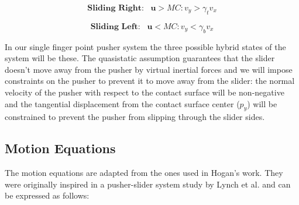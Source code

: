 \documentclass[12,twoside]{TFG-GM}
\theoremstyle{definition}
\theoremstyle{remark}
\begin{document}
\begin{equation}\label{eq:right_cone}
\textbf{Sliding Right:}\,\,\,\,\, \textbf{u} > MC: v_y > \gamma_t v_x            
\end{equation}

\begin{equation}\label{eq:left_cone}
\textbf{Sliding Left:}\,\,\,\,\, \textbf{u} < MC: v_y < \gamma_b v_x
\end{equation}

In our single finger point pusher system the three possible hybrid states of the system will be these. The quasistatic assumption guarantees that the slider doesn't move away from the pusher by virtual inertial forces and we will impose constraints on the pusher to prevent it to move away from the slider: the normal velocity of the pusher with respect to the contact surface will be non-negative and the tangential displacement from the contact surface center ($p_y$) will be constrained to prevent the pusher from slipping through the slider sides.

\subsection{Motion Equations} \label{subsec:motion_equations}
The motion equations are adapted from the ones used in Hogan's work. They were originally inspired in a pusher-slider system study by Lynch et al. \cite{motion_equations} and can be expressed as follows:
\end{document}
